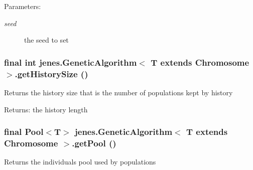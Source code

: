 \begin{Desc}
\item[Parameters:]
\begin{description}
\item[{\em seed}]the seed to set \end{description}
\end{Desc}
\hypertarget{classjenes_1_1_genetic_algorithm_3_01_t_01extends_01_chromosome_01_4_b52be3b0fcd2f424ae191ff4e642edf3}{
\subsubsection[getHistorySize]{\setlength{\rightskip}{0pt plus 5cm}final int jenes.GeneticAlgorithm$<$ T extends Chromosome $>$.getHistorySize ()}}
\label{classjenes_1_1_genetic_algorithm_3_01_t_01extends_01_chromosome_01_4_b52be3b0fcd2f424ae191ff4e642edf3}


Returns the history size that is the number of populations kept by history 

\begin{Desc}
\item[Returns:]the history length \end{Desc}
\hypertarget{classjenes_1_1_genetic_algorithm_3_01_t_01extends_01_chromosome_01_4_d254fc6b2ff476bc7f7837d03e677786}{
\subsubsection[getPool]{\setlength{\rightskip}{0pt plus 5cm}final Pool$<$T$>$ jenes.GeneticAlgorithm$<$ T extends Chromosome $>$.getPool ()}}
\label{classjenes_1_1_genetic_algorithm_3_01_t_01extends_01_chromosome_01_4_d254fc6b2ff476bc7f7837d03e677786}


Returns the individuals pool used by populations

